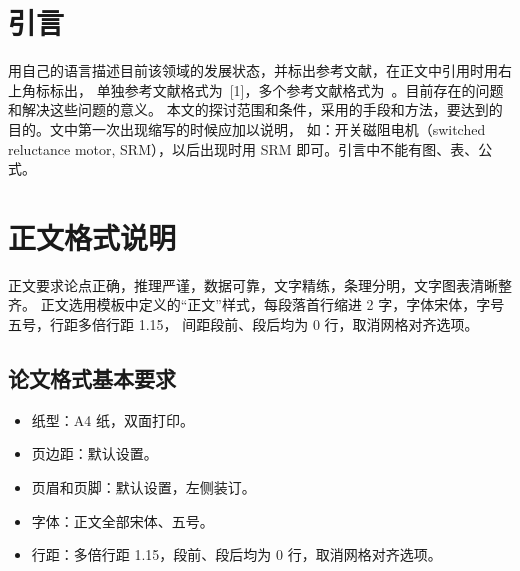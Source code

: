 \documentclass[UTF8]{hustjournal}
\begin{document}
\twocolumn[\maketitle]


\section{引\;言}
用自己的语言描述目前该领域的发展状态，并标出参考文献，在正文中引用时用右上角标标出，%
单独参考文献格式为~[1]，多个参考文献格式为~。目前存在的问题和解决这些问题的意义。%
本文的探讨范围和条件，采用的手段和方法，要达到的目的。文中第一次出现缩写的时候应加以说明，%
如：开关磁阻电机（switched reluctance motor, SRM），以后出现时用 SRM 即可。引言中不能有图、表、公式。

\section{正文格式说明}
正文要求论点正确，推理严谨，数据可靠，文字精练，条理分明，文字图表清晰整齐。%
正文选用模板中定义的``正文''样式，每段落首行缩进 2 字，字体宋体，字号五号，行距多倍行距 1.15，%
间距段前、段后均为 0 行，取消网格对齐选项。

\subsection{论文格式基本要求}
\begin{itemize}
  \item 纸\;型：A4 纸，双面打印。
  \item 页边距：默认设置。
  \item 页眉和页脚：默认设置，左侧装订。
  \item 字\;体：正文全部宋体、五号。
  \item 行\;距：多倍行距 1.15，段前、段后均为 0 行，取消网格对齐选项。
\end{itemize}
\end{document}
